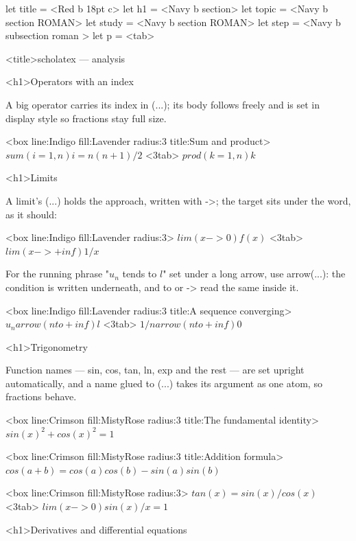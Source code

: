 \documentclass[
  margins=8,
  font=Latin Modern Roman,
  size=12,
  linespread=1.4,
  lang=en,
  precision=4
]{scholatex}
\begin{document}
let title = <Red b 18pt c>
let h1    = <Navy b section>
let topic = <Navy b section ROMAN>
let study = <Navy b section ROMAN>
let step  = <Navy b subsection roman >
let p     = <tab>

<title>scholatex — analysis

<h1>Operators with an index

A big operator carries its index in (...); its body follows freely
and is set in display style so fractions stay full size.

<box line:Indigo fill:Lavender radius:3 title:{Sum and product}>{
	$sum(i=1, n) i = n(n+1)/2$ <3tab> $prod(k=1, n) k$
}

<h1>Limits

A limit's (...) holds the approach, written with ->; the target
sits under the word, as it should:

<box line:Indigo fill:Lavender radius:3>{
	$lim(x->0) f(x)$ <3tab> $lim(x->+inf) 1/x$
}

For the running phrase "$u_n$ tends to $l$" set under a long arrow, use
arrow(...): the condition is written underneath, and to or ->
read the same inside it.

<box line:Indigo fill:Lavender radius:3 title:{A sequence converging}>{
	$u_n arrow(n to +inf) l$ <3tab> $1/n arrow(n to +inf) 0$
}

<h1>Trigonometry

Function names — sin, cos, tan, ln, exp and
the rest — are set upright automatically, and a name glued to (...)
takes its argument as one atom, so fractions behave.

<box line:Crimson fill:MistyRose radius:3 title:{The fundamental identity}>{
	$sin(x)^2 + cos(x)^2 = 1$
}

<box line:Crimson fill:MistyRose radius:3 title:{Addition formula}>{
	$cos(a+b) = cos(a)cos(b) - sin(a)sin(b)$
}

<box line:Crimson fill:MistyRose radius:3>{
	$tan(x) = sin(x)/cos(x)$ <3tab> $lim(x->0) sin(x)/x = 1$
}

<h1>Derivatives and differential equations
\end{document}
